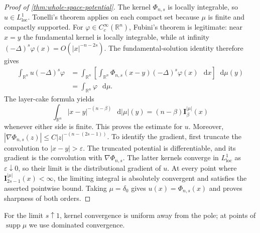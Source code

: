 \documentclass[reqno]{amsart}
\numberwithin{equation}{section}
\theoremstyle{plain}
\theoremstyle{definition}
\theoremstyle{remark}
\newcommand{\R}{\mathbb R}
\newcommand{\I}{\mathbf I}
\newcommand{\differential}{\mathop{}\!\mathrm d}
\newcommand{\rev}[1]{#1}
\begin{document}
\begin{proof}[Proof of \cref{thm:whole-space-potential}]
\begingroup
The kernel $\Phi_{n,s}$ is locally integrable, so $u\in L^1_{\mathrm{loc}}$.
Tonelli's theorem applies on each compact set because
$\mu$ is finite and compactly supported.  For
$\varphi\in C_c^\infty(\R^n)$, Fubini's theorem is legitimate: near
$x=y$ the fundamental kernel is locally integrable, while at infinity
$(-\Delta)^s\varphi(x)=O(|x|^{-n-2s})$.  The fundamental-solution identity
therefore gives
\begin{align*}
 \int_{\R^n}u(-\Delta)^s\varphi
 &=\int_{\R^n}\!\left[\int_{\R^n}
 \Phi_{n,s}(x-y)(-\Delta)^s\varphi(x)\,\differential x\right]
 \differential\mu(y)\\
 &=\int_{\R^n}\varphi\,\differential\mu.
\end{align*}
The layer-cake formula yields
\[
 \int_{\R^n}|x-y|^{-(n-\beta)}\,\differential|\mu|(y)
 =(n-\beta)\I_\beta^{|\mu|}(x)
\]
whenever either side is finite.  This proves the estimate for $u$.  Moreover,
$|\nabla\Phi_{n,s}(z)|\le C|z|^{-(n-(2s-1))}$.  To identify the gradient,
first truncate the convolution to $|x-y|>\varepsilon$.  The truncated
potential is differentiable, and its gradient is the convolution with
$\nabla\Phi_{n,s}$.  The latter kernels converge in
$L^1_{\mathrm{loc}}$ as $\varepsilon\downarrow0$, so their limit is the
distributional gradient of $u$.  At every point where
$\I_{2s-1}^{|\mu|}(x)<\infty$, the limiting integral is absolutely
convergent and satisfies the asserted pointwise bound.  Taking
$\mu=\delta_0$ gives $u(x)=\Phi_{n,s}(x)$ and proves sharpness of both
orders.
\endgroup
\end{proof}

\rev{For the limit $s\uparrow1$, kernel convergence is uniform away from
the pole; at points of $\operatorname{supp}\mu$ we use dominated
convergence.}
\end{document}
